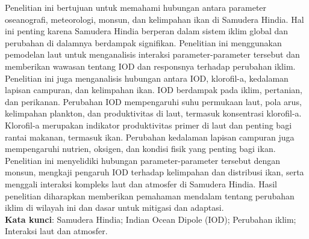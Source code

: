 \begin{spacing}{1.5}
	\pagestyle{empty}
	\begin{center}
		\vskip 1cm
		\justifying
		Penelitian ini bertujuan untuk memahami hubungan antara parameter oseanografi, meteorologi, monsun, dan kelimpahan ikan di Samudera Hindia. Hal ini penting karena Samudera Hindia berperan dalam sistem iklim global dan perubahan di dalamnya berdampak signifikan. Penelitian ini menggunakan pemodelan laut untuk menganalisis interaksi parameter-parameter tersebut dan memberikan wawasan tentang IOD dan responsnya terhadap perubahan iklim. Penelitian ini juga menganalisis hubungan antara IOD, klorofil-a, kedalaman lapisan campuran, dan kelimpahan ikan. IOD berdampak pada iklim, pertanian, dan perikanan. Perubahan IOD mempengaruhi suhu permukaan laut, pola arus, kelimpahan plankton, dan produktivitas di laut, termasuk konsentrasi klorofil-a. Klorofil-a merupakan indikator produktivitas primer di laut dan penting bagi rantai makanan, termasuk ikan. Perubahan kedalaman lapisan campuran juga mempengaruhi nutrien, oksigen, dan kondisi fisik yang penting bagi ikan. Penelitian ini menyelidiki hubungan parameter-parameter tersebut dengan monsun, mengkaji pengaruh IOD terhadap kelimpahan dan distribusi ikan, serta menggali interaksi kompleks laut dan atmosfer di Samudera Hindia. Hasil penelitian diharapkan memberikan pemahaman mendalam tentang perubahan iklim di wilayah ini dan dasar untuk mitigasi dan adaptasi.\\
		\textbf{Kata kunci}: Samudera Hindia; Indian Ocean Dipole (IOD); Perubahan iklim; Interaksi laut dan atmosfer.
	\end{center}
\end{spacing}
\pagestyle{empty}